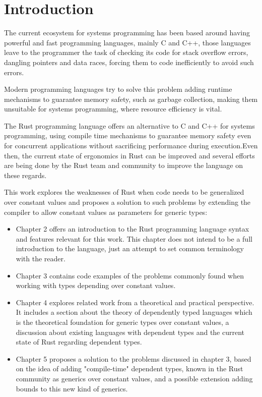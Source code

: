 \chapter{Introduction}
\label{chapter:introduction}
The current ecosystem for systems programming has been based around having powerful and fast programming languages, mainly C and C++, those languages leave to the programmer the task of checking its code for stack overflow errors, dangling pointers and data races, forcing them to code inefficiently to avoid such errors.

Modern programming languages try to solve this problem adding runtime mechanisms to guarantee memory safety, such as garbage collection, making them unsuitable for systems programming, where resource efficiency is vital.

The Rust programming language offers an alternative to C and C++ for systems programming, using compile time mechanisms to guarantee memory safety even for concurrent applications without sacrificing performance during execution.Even then, the current state of ergonomics in Rust can be improved and several efforts are being done by the Rust team and community to improve the language on these regards.

This work explores the weaknesses of Rust when code needs to be generalized over constant values and proposes a solution to such problems by extending the compiler to allow constant values as parameters for generic types:
\begin{itemize}
    \item Chapter 2 offers an introduction to the Rust programming language syntax and features relevant for this work. This chapter does not intend to be a full introduction to the language, just an attempt to set common terminology with the reader.
    \item Chapter 3 contains code examples of the problems commonly found when working with types depending over constant values. 
    \item Chapter 4 explores related work from a theoretical and practical perspective. It includes a section about the theory of dependently typed languages which is the theoretical foundation for generic types over constant values, a discussion about existing languages with dependent types and the current state of Rust regarding dependent types.
    \item Chapter 5 proposes a solution to the problems discussed in chapter 3, based on the idea of adding "compile-time" dependent types, known in the Rust community as generics over constant values, and a possible extension adding bounds to this new kind of generics.
\end{itemize}

